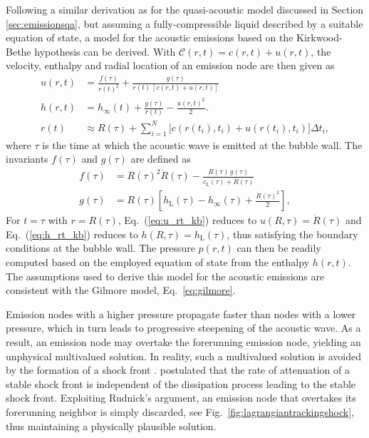 Following a similar derivation as for the quasi-acoustic model discussed in Section \ref{sec:emissionsqa}, but assuming a fully-compressible liquid described by a suitable equation of state, a model for the acoustic emissions based on the Kirkwood-Bethe hypothesis \citep{Kirkwood1942,Cole1948} can be derived. With $\mathcal{C}(r,t) = c(r,t) + u(r,t)$, the velocity, enthalpy and radial location of an emission node are then given as
\begin{align}
    u(r,t) &= \frac{f(\tau)}{r(t)^2} + \frac{g(\tau)}{r(t) \, [c(r,t) + u(r,t)]}  \label{eq:u_rt_kb} \\
    h(r,t) &= h_\infty(t) + \frac{g(\tau)}{r(t)} - \frac{u(r,t)^2}{2}. \label{eq:h_rt_kb}\\
    r(t) &\approx R(\tau) + \sum_{i=1}^N \big[c(r(t_i),t_i) + u(r(t_i),t_i) \big] \Delta t_{i}, \label{eq:r_t_kb}
\end{align}
where $\tau$ is the time at which the acoustic wave is emitted at the bubble wall.
The invariants $f(\tau)$ and $g(\tau)$ are defined as
\begin{align}
    f(\tau) &= R(\tau)^2 \dot{R}(\tau) - \frac{R(\tau) \, g(\tau)}{c_\mathrm{L}(\tau) + \dot{R}(\tau)}   \label{eq:f_R} \\  
    g(\tau) &= R(\tau) \left[h_\mathrm{L}(\tau) - h_\infty(\tau) + \frac{\dot{R}(\tau)^2}{2} \right]
    \label{eq:g_R} ,
\end{align}
For $t=\tau$ with $r=R(\tau)$, Eq.~(\ref{eq:u_rt_kb}) reduces to $u(R,\tau)=\dot{R}(\tau)$ and Eq.~(\ref{eq:h_rt_kb}) reduces to $h(R,\tau)=h_\mathrm{L}(\tau)$, thus satisfying the boundary conditions at the bubble wall. The pressure $p(r,t)$ can then be readily computed based on the employed equation of state from the enthalpy $h(r,t)$. The assumptions used to derive this model for the acoustic emissions are consistent with the Gilmore model, Eq.~\eqref{eq:gilmore}.

Emission nodes with a higher pressure propagate faster than nodes with a lower pressure, which in turn leads to progressive steepening of the acoustic wave. As a result, an emission node may overtake the forerunning emission node, yielding an unphysical multivalued solution. In reality, such a multivalued solution is avoided by the formation of a shock front \citep{Fay1931}. \citet{Rudnick1952} postulated that the rate of attenuation of a stable shock front is independent of the dissipation process leading to the stable shock front. Exploiting Rudnick's argument, an emission node that overtakes its forerunning neighbor is simply discarded, see Fig.~\ref{fig:lagrangiantrackingshock}, thus maintaining a physically plausible solution.

